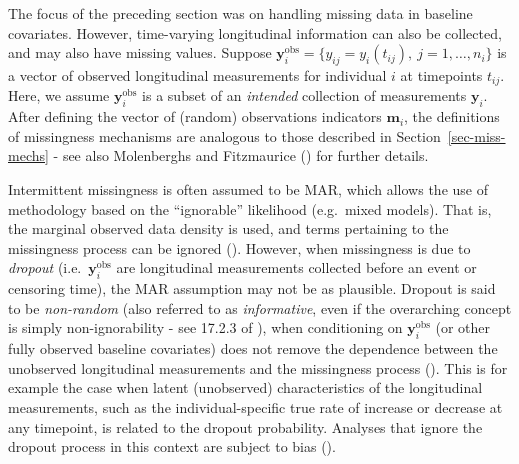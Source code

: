 \documentclass[
  letterpaper,
  paper=240mm:170mm,
  twoside=true,
  open=right,
  fontsize=10pt,
  pagesize=false,
  BCOR=15mm,
  DIV=14,
  headinclude=true,
  footinclude=false,
  headsepline=on]{scrbook}
\begin{document}
The focus of the preceding section was on handling missing data in
baseline covariates. However, time-varying longitudinal information can
also be collected, and may also have missing values. Suppose
\(\mathbf{y}_{i}^{\text{obs}} = \{y_{ij} = y_i(t_{ij}), \ j = 1,\ldots,n_i\}\)
is a vector of observed longitudinal measurements for individual \(i\)
at timepoints \(t_{ij}\). Here, we assume
\(\mathbf{y}_{i}^{\text{obs}}\) is a subset of an \emph{intended}
collection of measurements \(\mathbf{y}_{i}\). After defining the vector
of (random) observations indicators \(\mathbf{m}_{i}\), the definitions
of missingness mechanisms are analogous to those described in
Section~\ref{sec-miss-mechs} - see also Molenberghs and Fitzmaurice
() for
further details.

Intermittent missingness is often assumed to be MAR, which allows the
use of methodology based on the ``ignorable'' likelihood (e.g.~mixed
models). That is, the marginal observed data density is used, and terms
pertaining to the missingness process can be ignored
(). However, when missingness is due to \emph{dropout}
(i.e.~\(\mathbf{y}_{i}^{\text{obs}}\) are longitudinal measurements
collected before an event or censoring time), the MAR assumption may not
be as plausible. Dropout is said to be \emph{non-random} (also referred
to as \emph{informative}, even if the overarching concept is simply
non-ignorability - see 17.2.3 of
), when conditioning on
\(\mathbf{y}_{i}^{\text{obs}}\) (or other fully observed baseline
covariates) does not remove the dependence between the unobserved
longitudinal measurements and the missingness process
(). This is for example the case when latent
(unobserved) characteristics of the longitudinal measurements, such as
the individual-specific true rate of increase or decrease at any
timepoint, is related to the dropout probability. Analyses that ignore
the dropout process in this context are subject to bias
().
\end{document}
